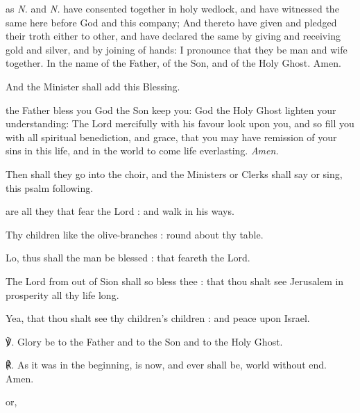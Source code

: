  as \textit{N.} and \textit{N.} have consented together in holy wedlock, and have witnessed the same here before God and this company; And thereto have given and pledged their troth either to other, and have declared the same by giving and receiving gold and silver, and by joining of hands: I pronounce that they be man and wife together. In the name of the Father, of the Son, and of the Holy Ghost. Amen.
\begin{rubric}
	And the Minister shall add this Blessing.
\end{rubric}
 the Father bless you {} God the Son keep you: God the Holy Ghost lighten your understanding: The Lord mercifully with his favour look upon you, and so fill you with all spiritual benediction, and grace, that you may have remission of your sins in this life, and in the world to come life everlasting. \textit{Amen.}
\begin{rubric}
	Then shall they go into the choir, and the Ministers or Clerks shall say or sing, this psalm following.
\end{rubric}
 are all they that fear the Lord : and walk in his ways.\par
{}
Thy children like the olive-branches : round about thy table.\par
{}Lo, thus shall the man be blessed : that feareth the Lord.\par
{}The Lord from out of Sion shall so bless thee : that thou shalt see Jerusalem in prosperity all thy life long.\par
{}Yea, that thou shalt see thy children's children : and peace upon Israel.\par
     ℣. Glory be to the Father and to the Son and to the Holy Ghost.\par
    ℟. As it was in the beginning, is now, and ever shall be, world without end. Amen.
    
\begin{inhead}
    or,
\end{inhead}

